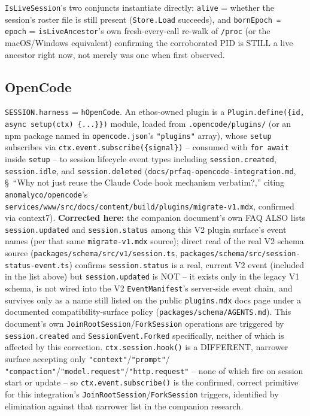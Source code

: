 \documentclass[a4paper,10pt,fleqn]{article}
\newcommand{\fpath}[1]{\texttt{#1}}
\newcommand{\field}[1]{\texttt{#1}}
\begin{document}
\field{IsLiveSession}'s two conjuncts instantiate directly:
\field{alive} = whether the session's roster file is still present
(\field{Store.Load} succeeds), and \field{bornEpoch = epoch} =
\field{isLiveAncestor}'s own fresh-every-call re-walk of
\fpath{/proc} (or the macOS/Windows equivalent) confirming the
corroborated PID is STILL a live ancestor right now, not merely was one
when first observed.

\subsection{OpenCode}
\label{sec:opencode-instantiation}

\fpath{SESSION.harness} = \field{hOpenCode}. An ethos-owned plugin is a
\field{Plugin.define(\{id, async setup(ctx) \{...\}\})} module, loaded
from \fpath{.opencode/plugins/} (or an npm package named in
\fpath{opencode.json}'s \field{"plugins"} array), whose \field{setup}
subscribes via \field{ctx.event.subscribe(\{signal\})} -- consumed with
\field{for await} inside \field{setup} -- to session lifecycle event
types including \field{session.created}, \field{session.idle},
and \field{session.deleted}
(\fpath{docs/prfaq-opencode-integration.md}, \S~``Why not just reuse
the Claude Code hook mechanism verbatim?,'' citing
\fpath{anomalyco/opencode}'s
\fpath{services/www/src/docs/content/build/plugins/migrate-v1.mdx},
confirmed via context7). \textbf{Corrected here:} the companion
document's own FAQ ALSO lists \field{session.updated} and
\field{session.status} among this V2 plugin surface's event names (per
that same \fpath{migrate-v1.mdx} source); direct read of the real V2
schema source (\fpath{packages/schema/src/v1/session.ts},
\fpath{packages/schema/src/session-status-event.ts}) confirms
\field{session.status} is a real, current V2 event (included in the
list above) but \field{session.updated} is NOT -- it exists only in
the legacy V1 schema, is not wired into the V2 \field{EventManifest}'s
server-side event chain, and survives only as a name still listed on
the public \fpath{plugins.mdx} docs page under a documented
compatibility-surface policy (\fpath{packages/schema/AGENTS.md}).
This document's own \field{JoinRootSession}/\field{ForkSession}
operations are triggered by \field{session.created} and
\field{SessionEvent.Forked} specifically, neither of which is affected
by this correction. \field{ctx.session.hook()} is a DIFFERENT,
narrower surface accepting only \field{"context"}/\field{"prompt"}/
\field{"compaction"}/\field{"model.request"}/\field{"http.request"} --
none of which fire on session start or update -- so
\field{ctx.event.subscribe()} is the confirmed, correct primitive for
this integration's \field{JoinRootSession}/\field{ForkSession}
triggers, identified by elimination against that narrower list in the
companion research.
\end{document}
